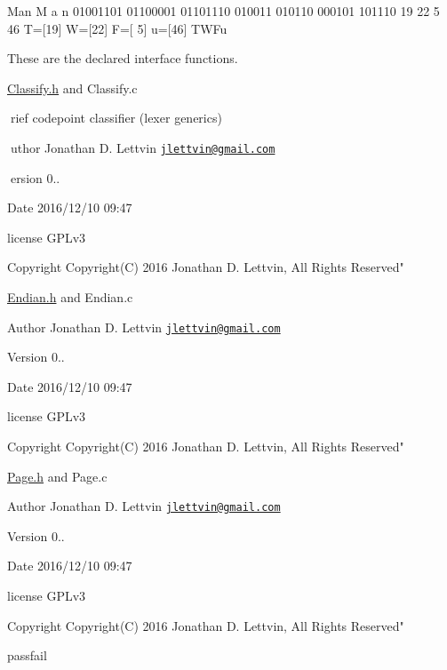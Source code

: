 Man M a n 01001101 01100001 01101110 010011 010110 000101 101110 19 22 5 46 T=\mbox{[}19\mbox{]} W=\mbox{[}22\mbox{]} F=\mbox{[} 5\mbox{]} u=\mbox{[}46\mbox{]} T\+W\+Fu

These are the declared interface functions.

\hyperlink{_classify_8h_source}{Classify.\+h} and Classify.\+c

rief codepoint classifier (lexer generics)

uthor Jonathan D. Lettvin \href{mailto:jlettvin@gmail.com}{\tt jlettvin@gmail.\+com}

ersion 0..

\begin{DoxyDate}{Date}
2016/12/10 09\+:47
\end{DoxyDate}
license G\+P\+Lv3

\begin{DoxyCopyright}{Copyright}
Copyright(\+C) 2016 Jonathan D. Lettvin, All Rights Reserved"
\end{DoxyCopyright}
\hyperlink{_endian_8h_source}{Endian.\+h} and Endian.\+c

\begin{DoxyAuthor}{Author}
Jonathan D. Lettvin \href{mailto:jlettvin@gmail.com}{\tt jlettvin@gmail.\+com}
\end{DoxyAuthor}
\begin{DoxyVersion}{Version}
0..
\end{DoxyVersion}
\begin{DoxyDate}{Date}
2016/12/10 09\+:47
\end{DoxyDate}
license G\+P\+Lv3

\begin{DoxyCopyright}{Copyright}
Copyright(\+C) 2016 Jonathan D. Lettvin, All Rights Reserved"
\end{DoxyCopyright}
\hyperlink{_page_8h_source}{Page.\+h} and Page.\+c

\begin{DoxyAuthor}{Author}
Jonathan D. Lettvin \href{mailto:jlettvin@gmail.com}{\tt jlettvin@gmail.\+com}
\end{DoxyAuthor}
\begin{DoxyVersion}{Version}
0..
\end{DoxyVersion}
\begin{DoxyDate}{Date}
2016/12/10 09\+:47
\end{DoxyDate}
license G\+P\+Lv3

\begin{DoxyCopyright}{Copyright}
Copyright(\+C) 2016 Jonathan D. Lettvin, All Rights Reserved"
\end{DoxyCopyright}
passfail

